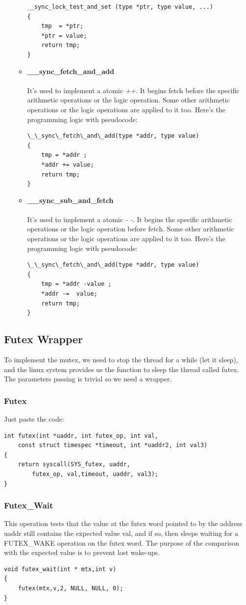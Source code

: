 \documentclass{article}
\begin{document}
\begin{itemize}
\begin{itemize}
			\begin{lstlisting}
__sync_lock_test_and_set (type *ptr, type value, ...)
{
	tmp  = *ptr;
	*ptr = value;
	return tmp;
}
			\end{lstlisting}
			\item \textbf{\_\_sync\_fetch\_and\_add} \\ \\
			It's used to implement a atomic \emph{++}. It begins fetch before the specific arithmetic operations or the logic operation. Some other arithmetic operations or the logic operations are applied to it too. Here's the programming logic with pseudocode:
			\begin{lstlisting}
\_\_sync\_fetch\_and\_add(type *addr, type value)
{
	tmp = *addr ;
	*addr += value;
	return tmp;
}
			\end{lstlisting}
			\item \textbf{\_\_sync\_sub\_and\_fetch} \\ \\
			It's used to implement a atomic  \emph{- -}. It begins the specific arithmetic operations or the logic operation before fetch. Some other arithmetic operations or the logic operations are applied to it too. Here's the programming logic with pseudocode:
			\begin{lstlisting}
\_\_sync\_fetch\_and\_add(type *addr, type value)
{
	tmp = *addr -value ;
	*addr -=  value;
	return tmp;
}
			\end{lstlisting}
		\end{itemize}
	\end{itemize} 
	\subsection{Futex Wrapper}
	To implement the mutex, we need to stop the thread for a while (let it sleep), and the linux system provides us the function to sleep the thread called futex. The parameters passing is trivial so we need a wrapper. \\
	\subsubsection{Futex}
	Just paste the code:
	\begin{lstlisting}
int futex(int *uaddr, int futex_op, int val, 
	const struct timespec *timeout, int *uaddr2, int val3)
{
	return syscall(SYS_futex, uaddr, 
		futex_op, val,timeout, uaddr, val3);
}
	\end{lstlisting}
	\subsubsection{Futex\_Wait}
	This operation tests that the value at the futex word pointed to by the address uaddr still contains the expected value val, and if so, then sleeps waiting for a FUTEX\_WAKE operation on the futex word. The purpose of the comparison with the expected value is to prevent lost wake-ups. \\
	\begin{lstlisting}
void futex_wait(int * mtx,int v)
{
	futex(mtx,v,2, NULL, NULL, 0);
}
	\end{lstlisting}
\end{document}
